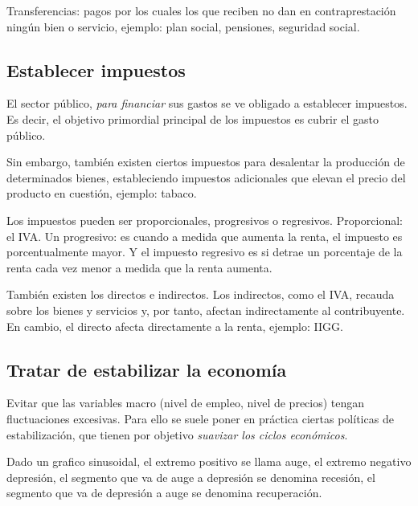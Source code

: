 Transferencias: pagos por los cuales los que reciben no dan en contraprestación ningún bien o servicio,
ejemplo: plan social, pensiones, seguridad social.

\subsection{Establecer impuestos}

El sector público, \textit{para financiar} sus gastos se ve obligado a establecer impuestos.
Es decir, el objetivo primordial principal de los impuestos es cubrir el gasto público.

Sin embargo, también existen ciertos impuestos para desalentar la producción de determinados bienes,
estableciendo impuestos adicionales que elevan el precio del producto en cuestión,
ejemplo: tabaco.

Los impuestos pueden ser proporcionales, progresivos o regresivos.
Proporcional: el IVA. 
Un progresivo: es cuando a medida que aumenta la renta,
el impuesto es porcentualmente mayor. 
Y el impuesto regresivo es si detrae un porcentaje de la renta cada vez menor a medida que la renta aumenta.

También existen los directos e indirectos.
Los indirectos, como el IVA, recauda sobre los bienes y servicios y, por tanto,
afectan indirectamente al contribuyente.
En cambio, el directo afecta directamente a la renta, ejemplo: IIGG.

\subsection{Tratar de estabilizar la economía}

Evitar que las variables macro (nivel de empleo, nivel de precios) tengan fluctuaciones excesivas.
Para ello se suele poner en práctica ciertas políticas de estabilización,
que tienen por objetivo \textit{suavizar los ciclos económicos}.

Dado un grafico sinusoidal,
el extremo positivo se llama auge,
el extremo negativo depresión,
el segmento que va de auge a depresión se denomina recesión,
el segmento que va de depresión a auge se denomina recuperación.


